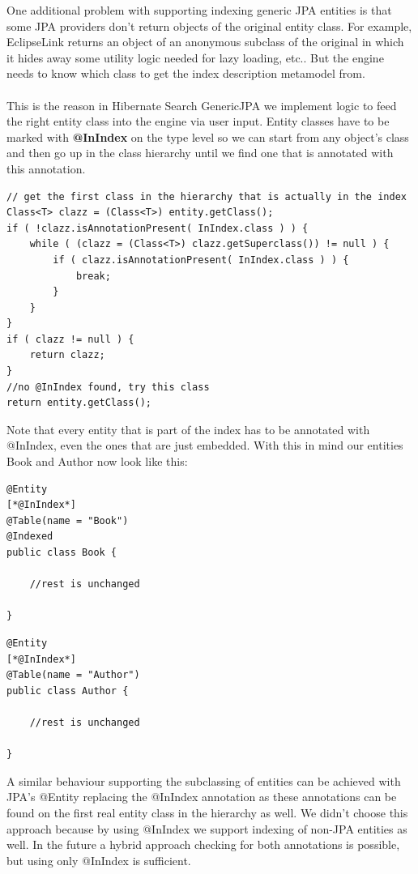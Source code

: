 \pagebreak
\noindent
One additional problem with supporting indexing generic JPA entities is that some JPA providers don't return objects of the original entity class. For example, EclipseLink returns an object of an anonymous subclass of the original in which it hides away some utility logic needed for lazy loading, etc.. But the engine needs to know which class to get the index description metamodel from.
\\\\
This is the reason in Hibernate Search GenericJPA we implement logic to feed the right entity class into the engine via user input. Entity classes have to be marked with \textbf{@InIndex} on the type level so we can start from any object's class and then go up in the class hierarchy until we find one that is annotated with this annotation.
\\
\lstset{language=java}
\begin{lstlisting}[frame=htrbl, caption={Algorithm to determine the actual indexed type}, label={lst:algo_subclasssupport}]
// get the first class in the hierarchy that is actually in the index
Class<T> clazz = (Class<T>) entity.getClass();
if ( !clazz.isAnnotationPresent( InIndex.class ) ) {
	while ( (clazz = (Class<T>) clazz.getSuperclass()) != null ) {
		if ( clazz.isAnnotationPresent( InIndex.class ) ) {
			break;
		}
	}
}
if ( clazz != null ) {
	return clazz;
}
//no @InIndex found, try this class
return entity.getClass();
\end{lstlisting}

\pagebreak
\noindent
Note that every entity that is part of the index has to be annotated with @InIndex, even the ones that are just embedded. With this in mind our entities Book and Author now look like this:
\\
\lstset{language=java}
\begin{lstlisting}[frame=htrbl, caption={Book.java with @InIndex}, label={lst:book.java_2}]
@Entity
[*@InIndex*]
@Table(name = "Book")
@Indexed
public class Book {
	
	//rest is unchanged

}
\end{lstlisting}

\lstset{language=java}
\begin{lstlisting}[frame=htrbl, caption={Author.java with @InIndex}, label={lst:author.java_2}]
@Entity
[*@InIndex*]
@Table(name = "Author")
public class Author {
	
	//rest is unchanged
	
}
\end{lstlisting}
\noindent
A similar behaviour supporting the subclassing of entities can be achieved with JPA's @Entity  replacing the @InIndex annotation as these annotations can be found on the first real entity class in the hierarchy as well. We didn't choose this approach because by using @InIndex we support indexing of non-JPA entities as well. In the future a hybrid approach checking for both annotations is possible, but using only @InIndex is sufficient.

